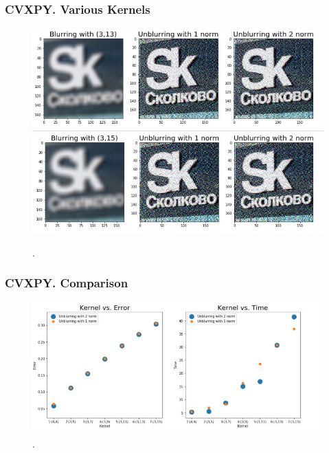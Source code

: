 \documentclass[hyperref={pdfpagelabels=false}]{beamer}
\begin{document}
\begin{frame}
\frametitle{CVXPY. Various Kernels}

\begin{center}
\begin{figure}[h]
\begin{adjustwidth}{-0.2cm}{-0.5 cm}
\includegraphics[scale=0.53]{3_13.jpg} \\
\includegraphics[scale=0.53]{3_15.jpg} \\
\end{adjustwidth}
\caption{.}
\end{figure}
\end{center}

\end{frame}
\begin{frame}
\frametitle{CVXPY. Comparison}

\begin{center}
\begin{figure}[h]
\begin{adjustwidth}{-0.2cm}{-0.5 cm}
\includegraphics[scale=0.55]{Kern.jpg}
\end{adjustwidth}
\caption{.}
\end{figure}
\end{center}

\end{frame}
\end{document}
